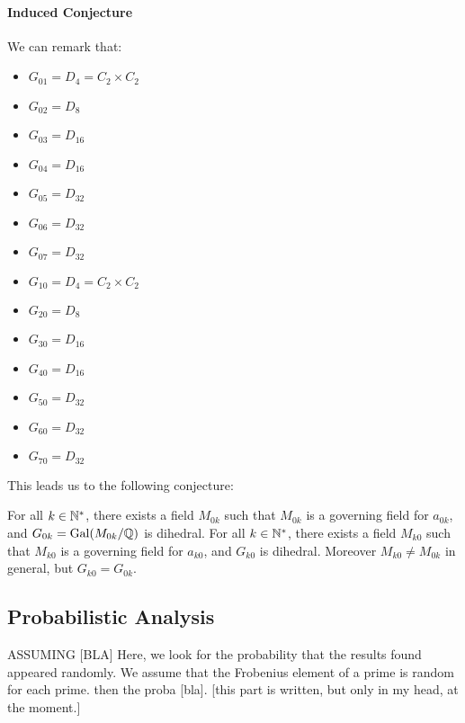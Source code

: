 \paragraph{Induced Conjecture}
We can remark that:
\begin{multicols}{2}
	\begin{itemize}
		\item $G_{01} = D_4 = C_2 \times C_2$
		\item $G_{02} = D_8$
		\item $G_{03} = D_{16}$
		\item $G_{04} = D_{16}$
		\item $G_{05} = D_{32}$
		\item $G_{06} = D_{32}$
		\item $G_{07} = D_{32}$
	\end{itemize}
	\begin{itemize}
		\item $G_{10} = D_4 = C_2 \times C_2$
		\item $G_{20} = D_8$
		\item $G_{30} = D_{16}$
		\item $G_{40} = D_{16}$
		\item $G_{50} = D_{32}$
		\item $G_{60} = D_{32}$
		\item $G_{70} = D_{32}$
	\end{itemize}
\end{multicols}

This leads us to the following conjecture:
\label{diagonalGoverningGroupsConjecture}
\begin{conjecture}
	For all $k \in \mathbb{N}^*$, there exists a field $M_{0k}$ such that $M_{0k}$ is a governing field for $a_{0k}$, and $G_{0k} = \text{Gal}(M_{0k}/\mathbb{Q})$ is dihedral.
	For all $k \in \mathbb{N}^*$, there exists a field $M_{k0}$ such that $M_{k0}$ is a governing field for $a_{k0}$, and $G_{k0}$ is dihedral.
	Moreover $M_{k0} \neq M_{0k}$ in general, but $G_{k0} = G_{0k}$.
\end{conjecture}



\subsection{Probabilistic Analysis}
ASSUMING [BLA]
Here, we look for the probability that the results found appeared randomly.
We assume that the Frobenius element of a prime is random for each prime.
then the proba [bla].
[this part is written, but only in my head, at the moment.]

